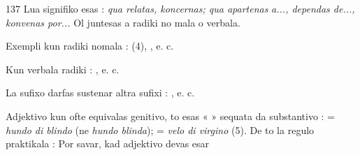 \begin{VUpage}[141]{137}
Lua signifiko esas : \textit{qua relatas, koncernas; qua apartenas}\nl
\textit{a..., dependas de..., konvenas por...} Ol juntesas a radiki no\cc
mala o verbala.

Exempli kun radiki nomala : \nl
{} (4), \cc
{}, e. c.\parplein

Kun verbala radiki : \nl
{}\cc
{}, e. c.

La sufixo  darfas sustenar altra sufixi : \nl
{}, e. c.

Adjektivo kun  ofte equivalas genitivo, to esas «  »\nl
sequata da substantivo :  = \textit{hundo di blindo}\nl
(ne \textit{hundo blinda});  = \textit{velo di virgino} (5). De\nl
to la regulo praktikala : Por savar, kad adjektivo devas esar\parplein
\end{VUpage}

